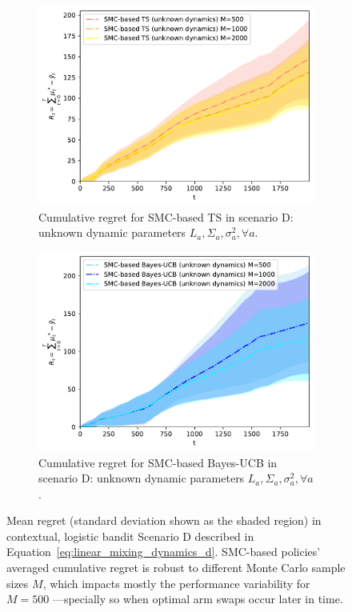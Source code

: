 \begin{figure}[!h]
	\begin{subfigure}[b]{0.45\textwidth}
		\includegraphics[width=\textwidth]{./fods_figs/dynamic/logistic/d_selectedM_cumulative_regret_dunknown_ts}
		\caption{Cumulative regret for SMC-based TS in scenario D: unknown dynamic parameters $L_a,\Sigma_a,\sigma_a^2, \forall a$.}
		\label{fig:dynamic_bandits_logistic_d_ts_dunknown_M}
	\end{subfigure}\qquad
	\begin{subfigure}[b]{0.45\textwidth}
		\includegraphics[width=\textwidth]{./fods_figs/dynamic/logistic/d_selectedM_cumulative_regret_dunknown_bucb}
		\caption{Cumulative regret for SMC-based Bayes-UCB in scenario D: unknown dynamic parameters $L_a,\Sigma_a,\sigma_a^2, \forall a$.}
		\label{fig:dynamic_bandits_logistic_d_bucb_dunknown_M}
	\end{subfigure}
	
	\caption{
		Mean regret (standard deviation shown as the shaded region) in contextual, logistic bandit Scenario D
		described in Equation~\eqref{eq:linear_mixing_dynamics_d}.
		SMC-based policies' averaged cumulative regret is robust to different Monte Carlo sample sizes $M$,
		which impacts mostly the performance variability for $M=500$ ---specially so when optimal arm swaps occur later in time.
	}
	\label{fig:dynamic_bandits_logistic_d_M}
\end{figure}
